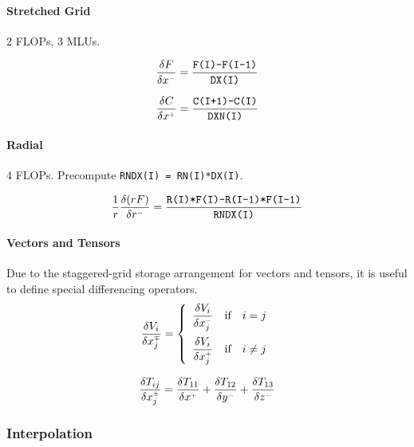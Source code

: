 \documentclass[11pt]{article}
\begin{document}
\paragraph{Stretched Grid} 2 FLOPs, 3 MLUs.

\begin{equation}
\label{eqn_difference_operator_stretched_face}
\frac{\delta F}{\delta x^{\scriptscriptstyle -}} = \frac{\mbox{\tt F(I)-F(I-1)}}{\mbox{\tt DX(I)}}
\end{equation}

\begin{equation}
\label{eqn_difference_operator_stretched_cell}
\frac{\delta C}{\delta x^{\scriptscriptstyle +}} = \frac{\mbox{\tt C(I+1)-C(I)}}{\mbox{\tt DXN(I)}}
\end{equation}

\paragraph{Radial} 4 FLOPs. Precompute {\tt RNDX(I) = RN(I)*DX(I)}.

\begin{equation}
\label{eqn_radial_difference}
\frac{1}{r} \frac{\delta (rF)}{\delta r^{\scriptscriptstyle -}} = \frac{\mbox{\tt R(I)*F(I)-R(I-1)*F(I-1)}}{\mbox{\tt RNDX(I)}}
\end{equation}

\paragraph{Vectors and Tensors} Due to the staggered-grid storage arrangement for vectors and tensors, it is useful to define special differencing operators.
\begin{equation}
\frac{\delta V_i}{\delta x_j^\ssmp} = \left\{ \begin{array}{ll} \displaystyle \frac{\delta V_i}{\delta x_j^\ssm} & \mbox{if} \quad i=j \vspace{.2cm} \\ \displaystyle \frac{\delta V_i}{\delta x_j^\ssp} & \mbox{if} \quad i\ne j \end{array} \right.
\end{equation}

\begin{equation}
\frac{\delta T_{ij}}{\delta x_j^{\scriptscriptstyle \pm}} = \frac{\delta T_{11}}{\delta x^{\scriptscriptstyle +}} + \frac{\delta T_{12}}{\delta y^{\scriptscriptstyle -}} + \frac{\delta T_{13}}{\delta z^{\scriptscriptstyle -}}
\end{equation}


\subsubsection{Interpolation}
\end{document}
